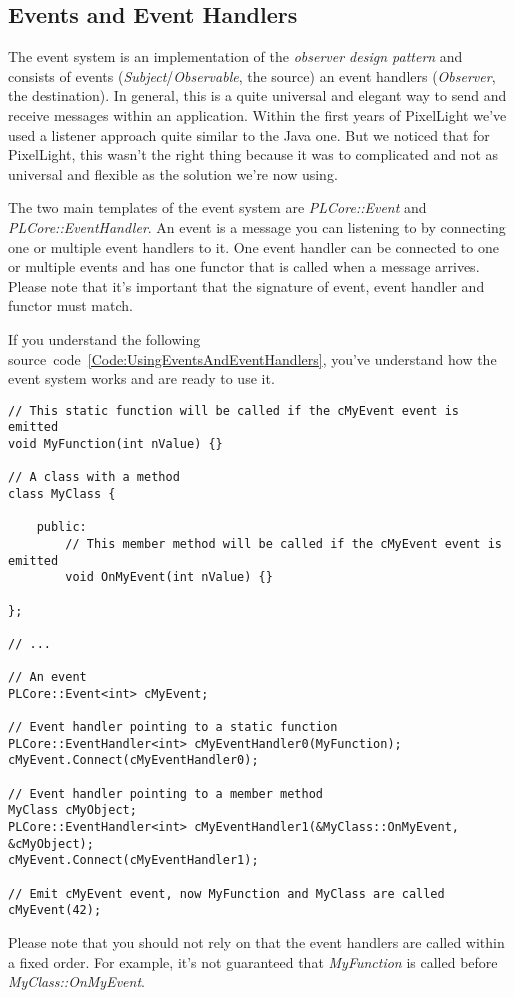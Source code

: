 \subsection{Events and Event Handlers}
\label{Chapter:EventsAndEventHandlers}
The event system is an implementation of the \emph{observer design pattern} and consists of events (\emph{Subject}/\emph{Observable}, the source) an event handlers (\emph{Observer}, the destination). In general, this is a quite universal and elegant way to send and receive messages within an application. Within the first years of PixelLight we've used a listener approach quite similar to the Java one. But we noticed that for PixelLight, this wasn't the right thing because it was to complicated and not as universal and flexible as the solution we're now using.

The two main templates of the event system are \emph{PLCore::Event} and \emph{PLCore::EventHandler}. An event is a message you can listening to by connecting one or multiple event handlers to it. One event handler can be connected to one or multiple events and has one functor that is called when a message arrives. Please note that it's important that the signature of event, event handler and functor must match.

If you understand the following source~code~\ref{Code:UsingEventsAndEventHandlers}, you've understand how the event system works and are ready to use it.
\begin{lstlisting}[label=Code:UsingEventsAndEventHandlers,caption={Using events and event handlers}]
// This static function will be called if the cMyEvent event is emitted
void MyFunction(int nValue) {}

// A class with a method
class MyClass {

	public:
		// This member method will be called if the cMyEvent event is emitted
		void OnMyEvent(int nValue) {}

};

// ...

// An event
PLCore::Event<int> cMyEvent;

// Event handler pointing to a static function
PLCore::EventHandler<int> cMyEventHandler0(MyFunction);
cMyEvent.Connect(cMyEventHandler0);

// Event handler pointing to a member method
MyClass cMyObject;
PLCore::EventHandler<int> cMyEventHandler1(&MyClass::OnMyEvent, &cMyObject);
cMyEvent.Connect(cMyEventHandler1);

// Emit cMyEvent event, now MyFunction and MyClass are called
cMyEvent(42);
\end{lstlisting}
Please note that you should not rely on that the event handlers are called within a fixed order. For example, it's not guaranteed that \emph{MyFunction} is called before \emph{MyClass::OnMyEvent}.
